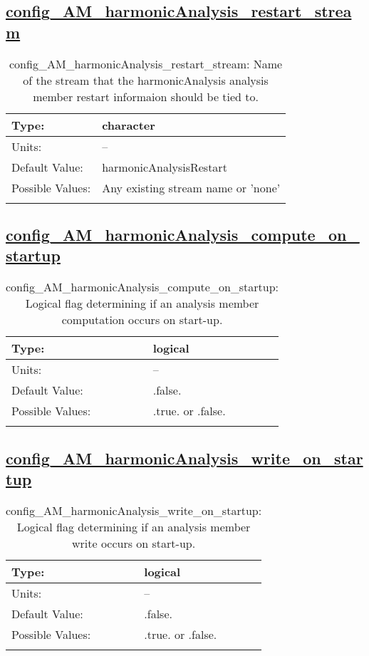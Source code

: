 \subsection[config\_AM\_harmonicAnalysis\_restart\_stream]{\hyperref[sec:nm_tab_AM_harmonicAnalysis]{config\_AM\_harmonicAnalysis\_restart\_stream}}
\label{subsec:nm_sec_config_AM_harmonicAnalysis_restart_stream}
\begin{center}
\begin{longtable}{| p{2.0in} || p{4.0in} |}
    \hline
    Type: & character \\
    \hline
    Units: & -- \\
    \hline
    Default Value: & harmonicAnalysisRestart \\
    \hline
    Possible Values: & Any existing stream name or 'none' \\
    \hline
    \caption{config\_AM\_harmonicAnalysis\_restart\_stream: Name of the stream that the harmonicAnalysis analysis member restart informaion should be tied to.}
\end{longtable}
\end{center}
\subsection[config\_AM\_harmonicAnalysis\_compute\_on\_startup]{\hyperref[sec:nm_tab_AM_harmonicAnalysis]{config\_AM\_harmonicAnalysis\_compute\_on\_startup}}
\label{subsec:nm_sec_config_AM_harmonicAnalysis_compute_on_startup}
\begin{center}
\begin{longtable}{| p{2.0in} || p{4.0in} |}
    \hline
    Type: & logical \\
    \hline
    Units: & -- \\
    \hline
    Default Value: & .false. \\
    \hline
    Possible Values: & .true. or .false. \\
    \hline
    \caption{config\_AM\_harmonicAnalysis\_compute\_on\_startup: Logical flag determining if an analysis member computation occurs on start-up.}
\end{longtable}
\end{center}
\subsection[config\_AM\_harmonicAnalysis\_write\_on\_startup]{\hyperref[sec:nm_tab_AM_harmonicAnalysis]{config\_AM\_harmonicAnalysis\_write\_on\_startup}}
\label{subsec:nm_sec_config_AM_harmonicAnalysis_write_on_startup}
\begin{center}
\begin{longtable}{| p{2.0in} || p{4.0in} |}
    \hline
    Type: & logical \\
    \hline
    Units: & -- \\
    \hline
    Default Value: & .false. \\
    \hline
    Possible Values: & .true. or .false. \\
    \hline
    \caption{config\_AM\_harmonicAnalysis\_write\_on\_startup: Logical flag determining if an analysis member write occurs on start-up.}
\end{longtable}
\end{center}
